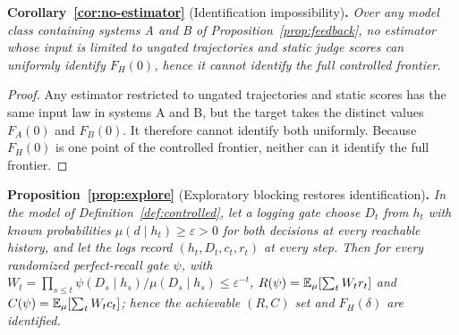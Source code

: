 \medskip
\noindent\textbf{Corollary~\ref{cor:no-estimator}} (Identification impossibility)\textbf{.}
\emph{Over any model class containing systems A and B of Proposition~\ref{prop:feedback}, no estimator whose input is limited to ungated trajectories and static judge scores can uniformly identify $F_H(0)$, hence it cannot identify the full controlled frontier.}
\begin{proof}
Any estimator restricted to ungated trajectories and static scores has the
same input law in systems A and B, but the target takes the distinct values
$F_A(0)$ and $F_B(0)$. It therefore cannot identify both uniformly. Because
$F_H(0)$ is one point of the controlled frontier, neither can it identify the
full frontier.
\end{proof}

\medskip
\noindent\textbf{Proposition~\ref{prop:explore}} (Exploratory blocking restores identification)\textbf{.}
\emph{In the model of Definition~\ref{def:controlled}, let a logging gate choose $D_t$ from $h_t$
with known probabilities $\mu(d\mid h_t)\ge\varepsilon>0$ for both decisions at every reachable
history, and let the logs record $(h_t,D_t,c_t,r_t)$ at every step. Then for every randomized
perfect-recall gate $\psi$, with $W_t=\prod_{s\le t}\psi(D_s\mid h_s)/\mu(D_s\mid h_s)\le\varepsilon^{-t}$,
$R(\psi)=\mathbb{E}_\mu[\sum_tW_tr_t]$ and $C(\psi)=\mathbb{E}_\mu[\sum_tW_tc_t]$; hence the achievable $(R,C)$ set
and $F_H(\delta)$ are identified.}

